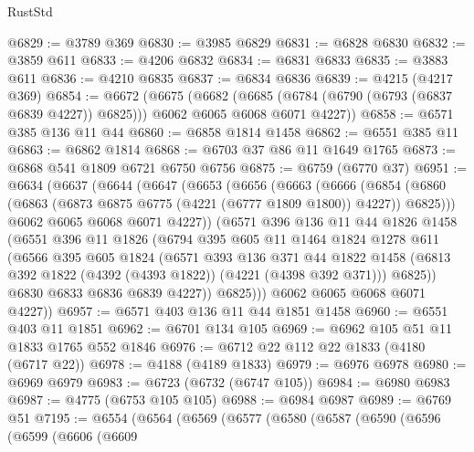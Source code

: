 \begin{lexlean}{RustStd}
\begin{coremodule}
@6829 := @3789 @369
@6830 := @3985 @6829
@6831 := @6828 @6830
@6832 := @3859 @611
@6833 := @4206 @6832
@6834 := @6831 @6833
@6835 := @3883 @611
@6836 := @4210 @6835
@6837 := @6834 @6836
@6839 := @4215 (@4217 @369)
@6854 := @6672
    (@6675
      (@6682
        (@6685 (@6784 (@6790 (@6793 (@6837 @6839 @4227)) @6825)))
        @6062
        @6065
        @6068
        @6071
        @4227))
@6858 := @6571 @385 @136 @11 @44
@6860 := @6858 @1814 @1458
@6862 := @6551 @385 @11
@6863 := @6862 @1814
@6868 := @6703 @37 @86 @11 @1649 @1765
@6873 := @6868 @541 @1809 @6721 @6750 @6756
@6875 := @6759 (@6770 @37)
@6951 := @6634
    (@6637
      (@6644
        (@6647
          (@6653
            (@6656
              (@6663
                (@6666
                  (@6854
                    (@6860 (@6863 (@6873 @6875 @6775 (@4221 (@6777 @1809 @1800)) @4227)) @6825)))
                @6062
                @6065
                @6068
                @6071
                @4227))
            (@6571
              @396
              @136
              @11
              @44
              @1826
              @1458
              (@6551
                @396
                @11
                @1826
                (@6794
                  @395
                  @605
                  @11
                  @1464
                  @1824
                  @1278
                  @611
                  (@6566
                    @395
                    @605
                    @1824
                    (@6571
                      @393
                      @136
                      @371
                      @44
                      @1822
                      @1458
                      (@6813 @392 @1822 (@4392 (@4393 @1822)) (@4221 (@4398 @392 @371)))
                      @6825))
                  @6830
                  @6833
                  @6836
                  @6839
                  @4227))
              @6825)))
        @6062
        @6065
        @6068
        @6071
        @4227))
@6957 := @6571 @403 @136 @11 @44 @1851 @1458
@6960 := @6551 @403 @11 @1851
@6962 := @6701 @134 @105
@6969 := @6962 @105 @51 @11 @1833 @1765 @552 @1846
@6976 := @6712 @22 @112 @22 @1833 (@4180 (@6717 @22))
@6978 := @4188 (@4189 @1833)
@6979 := @6976 @6978
@6980 := @6969 @6979
@6983 := @6723 (@6732 (@6747 @105))
@6984 := @6980 @6983
@6987 := @4775 (@6753 @105 @105)
@6988 := @6984 @6987
@6989 := @6769 @51
@7195 := @6554
    (@6564
      (@6569
        (@6577
          (@6580
            (@6587
              (@6590
                (@6596
                  (@6599
                    (@6606
                      (@6609

\end{coremodule}
\end{lexlean}
